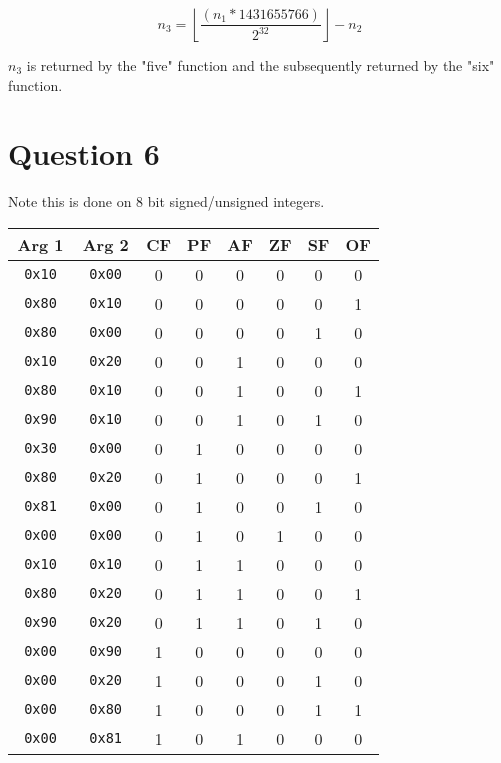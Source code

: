 \documentclass[11pt]{article}
\begin{document}
\[
    n_3 = \left\lfloor\frac{(n_1 * 1431655766)}{2^{32}}\right\rfloor - n_2
\] 

$n_3$ is returned by the "five" function and the subsequently returned by the "six" function.

\section*{Question 6}
Note this is done on 8 bit signed/unsigned integers.
\begin{table}[H]
    \centering
    \begin{tabular}{|c|c|c|c|c|c|c|c|}
        \hline
        Arg 1 & Arg 2 & CF & PF & AF & ZF & SF & OF\\
        \hline
        \texttt{ 0x10 } & \texttt{ 0x00 } & 0 & 0 & 0 & 0 & 0 & 0 \\
        \texttt{ 0x80 } & \texttt{ 0x10 } & 0 & 0 & 0 & 0 & 0 & 1 \\
        \texttt{ 0x80 } & \texttt{ 0x00 } & 0 & 0 & 0 & 0 & 1 & 0 \\
        \texttt{ 0x10 } & \texttt{ 0x20 } & 0 & 0 & 1 & 0 & 0 & 0 \\
        \texttt{ 0x80 } & \texttt{ 0x10 } & 0 & 0 & 1 & 0 & 0 & 1 \\
        \texttt{ 0x90 } & \texttt{ 0x10 } & 0 & 0 & 1 & 0 & 1 & 0 \\
        \texttt{ 0x30 } & \texttt{ 0x00 } & 0 & 1 & 0 & 0 & 0 & 0 \\
        \texttt{ 0x80 } & \texttt{ 0x20 } & 0 & 1 & 0 & 0 & 0 & 1 \\
        \texttt{ 0x81 } & \texttt{ 0x00 } & 0 & 1 & 0 & 0 & 1 & 0 \\
        \texttt{ 0x00 } & \texttt{ 0x00 } & 0 & 1 & 0 & 1 & 0 & 0 \\
        \texttt{ 0x10 } & \texttt{ 0x10 } & 0 & 1 & 1 & 0 & 0 & 0 \\
        \texttt{ 0x80 } & \texttt{ 0x20 } & 0 & 1 & 1 & 0 & 0 & 1 \\
        \texttt{ 0x90 } & \texttt{ 0x20 } & 0 & 1 & 1 & 0 & 1 & 0 \\
        \texttt{ 0x00 } & \texttt{ 0x90 } & 1 & 0 & 0 & 0 & 0 & 0 \\
        \texttt{ 0x00 } & \texttt{ 0x20 } & 1 & 0 & 0 & 0 & 1 & 0 \\
        \texttt{ 0x00 } & \texttt{ 0x80 } & 1 & 0 & 0 & 0 & 1 & 1 \\
        \texttt{ 0x00 } & \texttt{ 0x81 } & 1 & 0 & 1 & 0 & 0 & 0 \\

\end{tabular}
\end{table}
\end{document}
